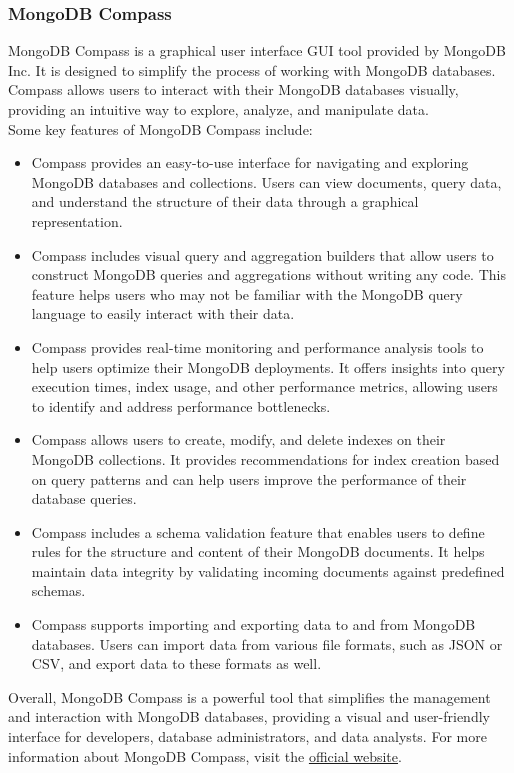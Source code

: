 \subsubsection{MongoDB Compass}
MongoDB Compass is a graphical user interface \ac{GUI} tool provided by MongoDB Inc. It is designed to simplify the process of working with MongoDB databases. Compass allows users to interact with their MongoDB databases visually, providing an intuitive way to explore, analyze, and manipulate data.\vspace{5mm} \\
Some key features of MongoDB Compass include:
\begin{itemize}
  \item Compass provides an easy-to-use interface for navigating and exploring MongoDB databases and collections. Users can view documents, query data, and understand the structure of their data through a graphical representation.
  \item Compass includes visual query and aggregation builders that allow users to construct MongoDB queries and aggregations without writing any code. This feature helps users who may not be familiar with the MongoDB query language to easily interact with their data.
  \item Compass provides real-time monitoring and performance analysis tools to help users optimize their MongoDB deployments. It offers insights into query execution times, index usage, and other performance metrics, allowing users to identify and address performance bottlenecks.
  \item Compass allows users to create, modify, and delete indexes on their MongoDB collections. It provides recommendations for index creation based on query patterns and can help users improve the performance of their database queries.
  \item Compass includes a schema validation feature that enables users to define rules for the structure and content of their MongoDB documents. It helps maintain data integrity by validating incoming documents against predefined schemas.
  \item Compass supports importing and exporting data to and from MongoDB databases. Users can import data from various file formats, such as JSON or CSV, and export data to these formats as well.
\end{itemize}
Overall, MongoDB Compass is a powerful tool that simplifies the management and interaction with MongoDB databases, providing a visual and user-friendly interface for developers, database administrators, and data analysts.
For more information about MongoDB Compass, visit the \href{https://www.mongodb.com/products/compass}{official website}.
